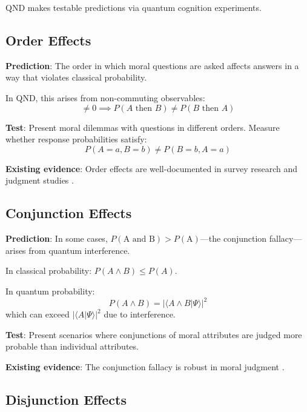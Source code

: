 \documentclass[12pt]{article}
\begin{document}
QND makes testable predictions via quantum cognition experiments.

\subsection{Order Effects}

\textbf{Prediction}: The order in which moral questions are asked affects answers in a way that violates classical probability.

In QND, this arises from non-commuting observables:
\begin{equation}
    [\hat{A}, \hat{B}] \neq 0 \implies P(A \text{ then } B) \neq P(B \text{ then } A)
\end{equation}

\textbf{Test}: Present moral dilemmas with questions in different orders. Measure whether response probabilities satisfy:
\begin{equation}
    P(A = a, B = b) \neq P(B = b, A = a)
\end{equation}

\textbf{Existing evidence}: Order effects are well-documented in survey research and judgment studies \cite{moore2002}.

\subsection{Conjunction Effects}

\textbf{Prediction}: In some cases, $P(\text{A and B}) > P(\text{A})$---the conjunction fallacy---arises from quantum interference.

In classical probability: $P(A \wedge B) \leq P(A)$.

In quantum probability:
\begin{equation}
    P(A \wedge B) = |\langle A \wedge B | \Psi \rangle|^2
\end{equation}
which can exceed $|\langle A | \Psi \rangle|^2$ due to interference.

\textbf{Test}: Present scenarios where conjunctions of moral attributes are judged more probable than individual attributes.

\textbf{Existing evidence}: The conjunction fallacy is robust in moral judgment \cite{tversky1983}.

\subsection{Disjunction Effects}
\end{document}
